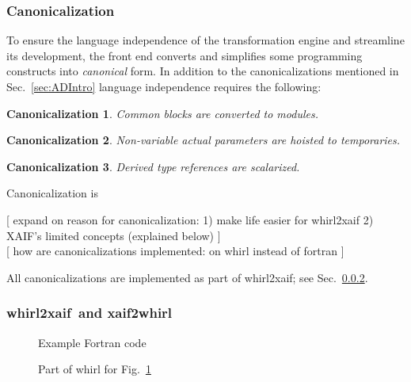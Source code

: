 \documentclass[11pt]{article}
\newcommand{\whirlToxaif}{whirl2xaif}
\newcommand{\xaifTowhirl}{xaif2whirl}
\newcommand{\refsec}[1]{{Sec.~\ref{#1}}}
\newcommand{\reffig}[1]{{Fig.~\ref{#1}}}
\newtheorem{Can}{Canonicalization}
\begin{document}
\subsubsection{Canonicalization}\label{sssec:Canonicalization}

To ensure the language independence of the transformation engine and
streamline its development, the front end converts and simplifies some
programming constructs into \emph{canonical} form.  In addition to the
canonicalizations mentioned in \refsec{sec:ADIntro} language
independence requires the following:

\begin{Can}\label{can:comBlock}
  Common blocks are converted to modules.
\end{Can}
\begin{Can}\label{can:param}
  Non-variable actual parameters are hoisted to temporaries.
\end{Can}
\begin{Can}\label{can:scalar}
  Derived type references are scalarized.
\end{Can}	


{\color{red}
  Canonicalization is 

  [ expand on reason for canonicalization: 
  1) make life easier for whirl2xaif
  2) XAIF's limited concepts (explained below) 
  ] \\

  [ how are canonicalizations implemented: on whirl instead of fortran ] \\

}

All canonicalizations are implemented as part of \whirlToxaif; see 
\refsec{sssec:wtxxtw}.

\subsubsection{\whirlToxaif\ and \xaifTowhirl}\label{sssec:wtxxtw}

\begin{figure}
  \scriptsize
  \caption{Example Fortran code}\label{fig:exampleFortranCode}
\end{figure}

\begin{figure}
  \scriptsize
  \caption{Part of whirl for \reffig{fig:exampleFortranCode}}\label{fig:exampleWhirlCode}
\end{figure}
\end{document}
